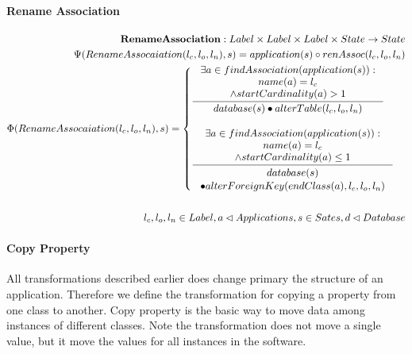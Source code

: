 \documentclass[11pt]{article}
\begin{document}
\paragraph{Rename Association}
\begin{align*}
\mathbf{RenameAssociation} : Label \times Label \times Label \times State \rightarrow State \\
\Psi(RenameAssocaiation(l_c, l_o, l_n), s) = application(s) \circ renAssoc(l_c, l_o, l_n)\\
\Phi(RenameAssocaiation(l_c, l_o, l_n), s) = \begin{cases}
	\inference{\exists a  \in findAssociation(application(s)) : \\
  name(a) = l_c \\ \wedge startCardinality(a) > 1 }{database(s) \bullet alterTable(l_c, l_o, l_n)}
 \\ \\
  \inference{\exists a  \in findAssociation(application(s)) : \\
  name(a) = l_c \\ \wedge startCardinality(a) \leq 1 }{\begin{gathered}
database(s) \\ \bullet alterForeignKey(endClass(a) ,l_c, l_o, l_n)
\end{gathered}}
 \end{cases}
\\\\
l_c, l_o, l_n \in Label, a \lhd Applications, s \in Sates, d \lhd Database
\end{align*}


\paragraph{Copy Property}
All transformations described earlier does change primary the structure of an application. Therefore we define  the transformation for copying a property from one class to another. Copy property is the basic way to move data among instances of different classes. Note the transformation does not move a single value, but it move the values for all instances in the software.
\end{document}
